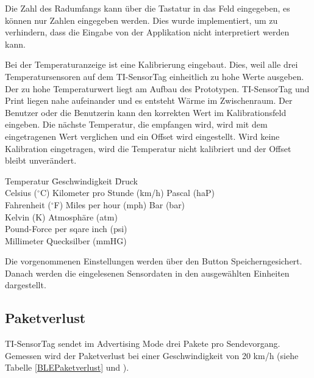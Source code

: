 Die Zahl des Radumfangs kann über die Tastatur in das Feld eingegeben, es können nur Zahlen eingegeben werden. Dies wurde implementiert, um zu verhindern, dass die Eingabe von der Applikation nicht interpretiert werden kann.

Bei der Temperaturanzeige ist eine Kalibrierung eingebaut. Dies, weil alle drei Temperatursensoren auf dem TI-SensorTag einheitlich zu hohe Werte ausgeben. Der zu hohe Temperaturwert liegt am Aufbau des Prototypen. TI-SensorTag und Print liegen nahe aufeinander und es entsteht Wärme im Zwischenraum. Der Benutzer oder die Benutzerin kann den korrekten Wert im Kalibrationsfeld eingeben. Die nächste Temperatur, die empfangen wird, wird mit dem eingetragenen Wert verglichen und ein Offset wird eingestellt. Wird keine Kalibration eingetragen, wird die Temperatur nicht kalibriert und der Offset bleibt unverändert.

\begin{minipage}{\textwidth}
    \begin{tabbing}
    Temperatur\hspace{.3cm} \quad\= Geschwindigkeit\hspace{2.7cm} \quad\= Druck \\[0.8ex]
    Celsius ($^{\circ}$C)    \> Kilometer pro Stunde (km/h)\> Pascal (haP)\\
    Fahrenheit ($^{\circ}$F) \> Miles per hour (mph)       \> Bar (bar)\\
    Kelvin (K)     \>                            \> Atmosph\"{a}re (atm)\\
                   \>                      \> Pound-Force per sqare inch (psi)\\
                   \>                      \> Millimeter Quecksilber (mmHG)\\
    \end{tabbing}
\end{minipage}
  
Die vorgenommenen Einstellungen werden über den Button \glqq Speichern\grqq gesichert. Danach werden die eingelesenen Sensordaten in den ausgewählten Einheiten dargestellt.

\subsection{Paketverlust}

TI-SensorTag sendet im Advertising Mode drei Pakete pro Sendevorgang. Gemessen wird der Paketverlust bei einer Geschwindigkeit von 20 km/h (siehe Tabelle \ref{BLEPaketverlust} und \cite{messung_BLE}). 

